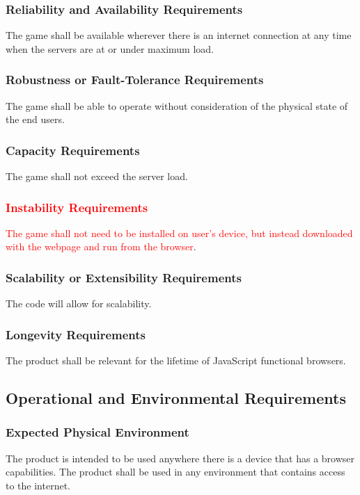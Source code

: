 \documentclass[11pt, oneside]{article}   	%
\begin{document}
\subsubsection{Reliability and Availability Requirements}
The game shall be available wherever there is an internet connection at any time when the servers are at or under maximum load.


\subsubsection{Robustness or Fault-Tolerance Requirements}
The game shall be able to operate without consideration of the physical state of the end users.


\subsubsection{Capacity Requirements}
The game shall not exceed the server load.


\subsubsection{\textcolor{red}{Instability Requirements}}
\textcolor{red}{The game shall not need to be installed on user's device, but instead downloaded with the webpage and run from the browser}.

\subsubsection{Scalability or Extensibility Requirements}
The code will allow for scalability.


\subsubsection{Longevity Requirements}
The product shall be relevant for the lifetime of JavaScript functional browsers.


\subsection{Operational and Environmental Requirements}
\subsubsection{Expected Physical Environment}
The product is intended to be used anywhere there is a device that has a browser capabilities. The product shall be used in any environment that contains access to the internet.
\end{document}

